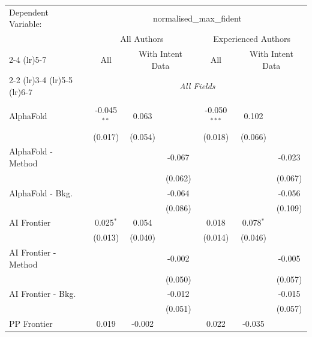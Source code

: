 \begingroup
\centering
\begin{tabular}{lcccccc}
   \tabularnewline \midrule \midrule
   Dependent Variable: & \multicolumn{6}{c}{normalised\_max\_fident}\\
 & \multicolumn{3}{c}{All Authors} & \multicolumn{3}{c}{Experienced Authors} \\
\cmidrule(lr){2-4} \cmidrule(lr){5-7}
 & \multicolumn{1}{c}{All} & \multicolumn{2}{c}{With Intent Data} & \multicolumn{1}{c}{All} & \multicolumn{2}{c}{With Intent Data} \\
\cmidrule(lr){2-2} \cmidrule(lr){3-4} \cmidrule(lr){5-5} \cmidrule(lr){6-7}
 & \multicolumn{6}{c}{\textit{All Fields}} \\ \\
   AlphaFold            & -0.045$^{**}$ & 0.063   &         & -0.050$^{***}$ & 0.102       &   \\   
                        & (0.017)       & (0.054) &         & (0.018)        & (0.066)     &   \\   
   AlphaFold - Method   &               &         & -0.067  &                &             & -0.023\\   
                        &               &         & (0.062) &                &             & (0.067)\\   
   AlphaFold - Bkg.     &               &         & -0.064  &                &             & -0.056\\   
                        &               &         & (0.086) &                &             & (0.109)\\   
   AI Frontier          & 0.025$^{*}$   & 0.054   &         & 0.018          & 0.078$^{*}$ &   \\   
                        & (0.013)       & (0.040) &         & (0.014)        & (0.046)     &   \\   
   AI Frontier - Method &               &         & -0.002  &                &             & -0.005\\   
                        &               &         & (0.050) &                &             & (0.057)\\   
   AI Frontier - Bkg.   &               &         & -0.012  &                &             & -0.015\\   
                        &               &         & (0.051) &                &             & (0.057)\\   
   PP Frontier          & 0.019         & -0.002  &         & 0.022          & -0.035      &   \\   

\end{tabular}
